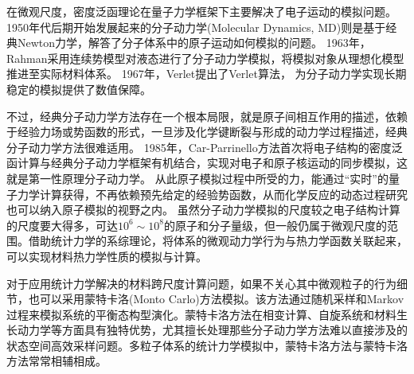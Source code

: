 在微观尺度，密度泛函理论在量子力学框架下主要解决了电子运动的模拟问题。1950年代后期开始发展起来的分子动力学\textrm{(Molecular Dynamics, MD)}则是基于经典\textrm{Newton}力学，解答了分子体系中的原子运动如何模拟的问题。%
1963年，Rahman采用连续势模型对液态进行了分子动力学模拟，将模拟对象从理想化模型推进至实际材料体系。
1967年，\textrm{Verlet}提出了\textrm{Verlet}算法，%
为分子动力学实现长期稳定的模拟提供了数值保障。

不过，经典分子动力学方法存在一个根本局限，就是原子间相互作用的描述，依赖于经验力场或势函数的形式，一旦涉及化学键断裂与形成的动力学过程描述，经典分子动力学方法很难适用。
1985年，\textrm{Car-Parrinello}方法首次将电子结构的密度泛函计算与经典分子动力学框架有机结合，实现对电子和原子核运动的同步模拟，这就是第一性原理分子动力学。%
从此原子模拟过程中所受的力，能通过“实时”的量子力学计算获得，不再依赖预先给定的经验势函数，从而化学反应的动态过程研究也可以纳入原子模拟的视野之内。
虽然分子动力学模拟的尺度较之电子结构计算的尺度要大得多，可达$10^6\sim10^8$的原子和分子量级，但一般仍属于微观尺度的范围。借助统计力学的系综理论，将体系的微观动力学行为与热力学函数关联起来，可以实现材料热力学性质的模拟与计算。

%
对于应用统计力学解决的材料跨尺度计算问题，如果不关心其中微观粒子的行为细节，也可以采用蒙特卡洛\textrm{(Monto Carlo)}方法模拟。该方法通过随机采样和\textrm{Markov}过程来模拟系统的平衡态构型演化。蒙特卡洛方法在相变计算、自旋系统和材料生长动力学等方面具有独特优势，尤其擅长处理那些分子动力学方法难以直接涉及的状态空间高效采样问题。多粒子体系的统计力学模拟中，蒙特卡洛方法与蒙特卡洛方法常常相辅相成。

